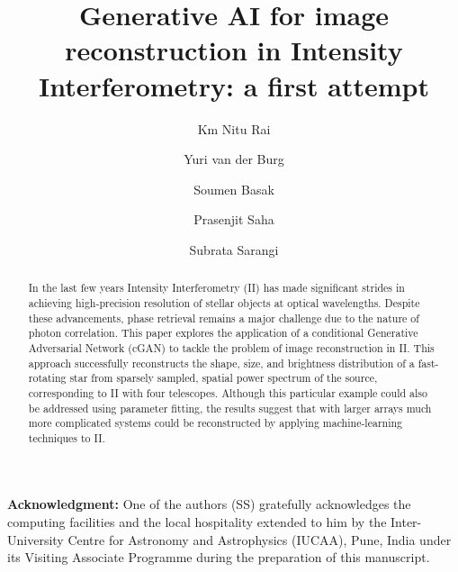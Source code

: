 \documentclass[linenumbers, twocolumn]{aastex701}
\begin{document}
\title{Generative AI for image reconstruction in Intensity Interferometry: a first attempt}

\author{Km Nitu Rai}

\author{Yuri van der Burg} 

\author{Soumen Basak}

\author{Prasenjit Saha}

\author{Subrata Sarangi}

\begin{abstract}
In the last few years Intensity Interferometry (II) has made significant strides in achieving high-precision resolution of stellar objects at optical wavelengths. Despite these advancements, phase retrieval remains a major challenge due to the nature of photon correlation. This paper explores the application of a conditional Generative Adversarial Network (cGAN) to tackle the problem of image reconstruction in II. This approach successfully reconstructs the shape, size, and brightness distribution of a fast-rotating star from sparsely sampled, spatial power spectrum of the source, corresponding to II with four telescopes.  Although this particular example could also be addressed using parameter fitting, the results suggest that with larger arrays much more complicated systems could be reconstructed by applying machine-learning techniques to II.
\end{abstract}








\begin{acknowledgements}
\textbf{Acknowledgment:} One of the authors (SS) gratefully acknowledges the computing facilities and the local hospitality extended to him by the Inter-University Centre for Astronomy and Astrophysics (IUCAA), Pune, India under its Visiting Associate Programme during the preparation of this manuscript.
\end{acknowledgements}



\end{document}

